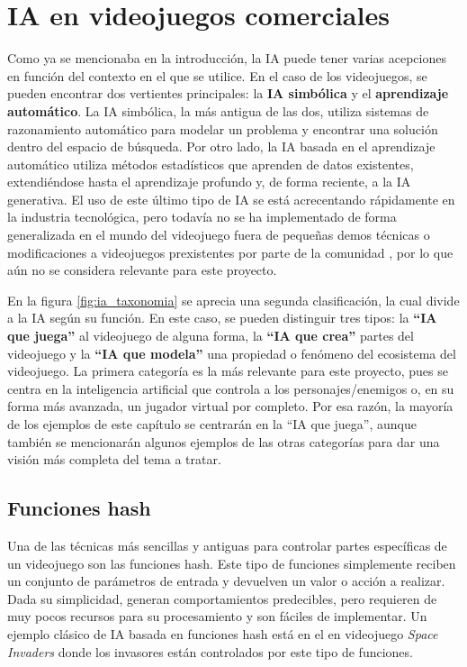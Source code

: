 \section{IA en videojuegos comerciales} \label{sec:ia_videojuegos}

Como ya se mencionaba en la introducción, la IA puede tener varias acepciones en función del contexto en el que se utilice. En el caso de los videojuegos, se pueden encontrar dos vertientes principales: la \textbf{IA simbólica} y el \textbf{aprendizaje automático}. La IA simbólica, la más antigua de las dos, utiliza sistemas de razonamiento automático para modelar un problema y encontrar una solución dentro del espacio de búsqueda. Por otro lado, la IA basada en el aprendizaje automático utiliza métodos estadísticos que aprenden de datos existentes, extendiéndose hasta el aprendizaje profundo y, de forma reciente, a la IA generativa. El uso de este último tipo de IA se está acrecentando rápidamente en la industria tecnológica, pero todavía no se ha implementado de forma generalizada en el mundo del videojuego fuera de pequeñas demos técnicas o modificaciones a videojuegos prexistentes por parte de la comunidad \cite{thompson_how_2025}, por lo que aún no se considera relevante para este proyecto.

En la figura \ref{fig:ia_taxonomia} se aprecia una segunda clasificación, la cual divide a la IA según su función. En este caso, se pueden distinguir tres tipos: la \textbf{``IA que juega''} al videojuego de alguna forma, la \textbf{``IA que crea''} partes del videojuego y la \textbf{``IA que modela''} una propiedad o fenómeno del ecosistema del videojuego. La primera categoría es la más relevante para este proyecto, pues se centra en la inteligencia artificial que controla a los personajes/enemigos o, en su forma más avanzada, un jugador virtual por completo. Por esa razón, la mayoría de los ejemplos de este capítulo se centrarán en la ``IA que juega'', aunque también se mencionarán algunos ejemplos de las otras categorías para dar una visión más completa del tema a tratar.

\subsection{Funciones hash}

Una de las técnicas más sencillas y antiguas para controlar partes específicas de un videojuego son las funciones hash. Este tipo de funciones simplemente reciben un conjunto de parámetros de entrada y devuelven un valor o acción a realizar. Dada su simplicidad, generan comportamientos predecibles, pero requieren de muy pocos recursos para su procesamiento y son fáciles de implementar. Un ejemplo clásico de IA basada en funciones hash está en el en videojuego \textit{Space Invaders} \cite{wikipedia_artificial_2025} donde los invasores están controlados por este tipo de funciones.

